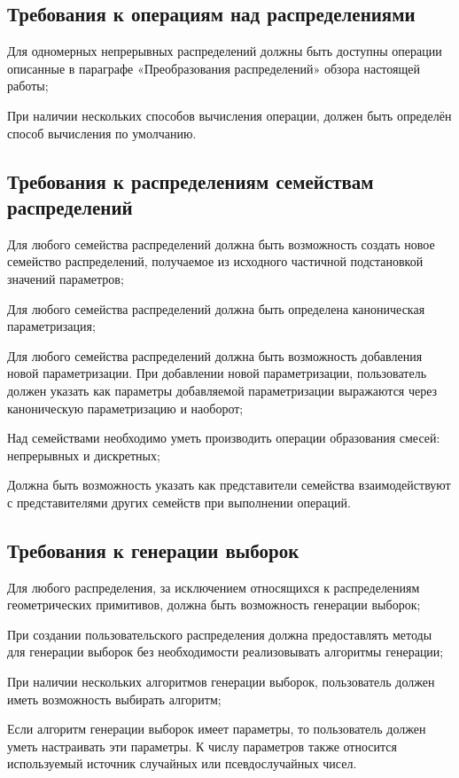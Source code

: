 \subsection{Требования к операциям над распределениями}
\begin{itemizecmp}
    \item Для одномерных непрерывных распределений должны быть доступны операции описанные в параграфе «Преобразования распределений» обзора настоящей работы;
    \item При наличии нескольких способов вычисления операции, должен быть определён способ вычисления по умолчанию.
\end{itemizecmp}

\subsection{Требования к распределениям семействам распределений}
\begin{itemizecmp}
    \item Для любого семейства распределений должна быть возможность создать новое семейство распределений, получаемое из исходного частичной подстановкой значений параметров;
    \item Для любого семейства распределений должна быть определена каноническая параметризация;
    \item Для любого семейства распределений должна быть возможность добавления новой параметризации. При добавлении новой параметризации, пользователь должен указать как параметры добавляемой параметризации выражаются через каноническую параметризацию и наоборот;
    \item Над семействами необходимо уметь производить операции образования смесей: непрерывных и дискретных;
    \item Должна быть возможность указать как представители семейства взаимодействуют с представителями других семейств при выполнении операций.
\end{itemizecmp}

\subsection{Требования к генерации выборок}
\begin{itemizecmp}
    \item Для любого распределения, за исключением относящихся к распределениям геометрических примитивов, должна быть возможность генерации выборок;
    \item При создании пользовательского распределения должна предоставлять методы для генерации выборок без необходимости реализовывать алгоритмы генерации;
    \item При наличии нескольких алгоритмов генерации выборок, пользователь должен иметь возможность выбирать алгоритм;
    \item Если алгоритм генерации выборок имеет параметры, то пользователь должен уметь настраивать эти параметры. К числу параметров также относится используемый источник случайных или псевдослучайных чисел.
\end{itemizecmp}

